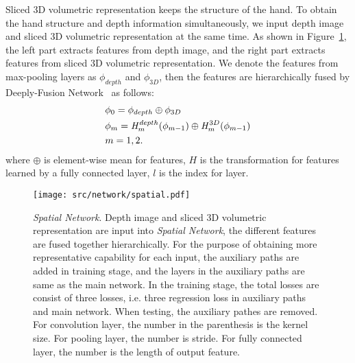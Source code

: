 \documentclass[journal,comsoc]{IEEEtran}
\let\MYoriglatexcaption\caption
\renewcommand{\caption}[2][\relax]{\MYoriglatexcaption[#2]{#2}}
\begin{document}


Sliced 3D volumetric representation keeps the structure of the hand.
To obtain the hand structure and depth information simultaneously, we input depth image and sliced 3D volumetric
representation at the same time. As shown in Figure~\ref{fig:spatial network}, the left part extracts features from
depth image, and the right part extracts features from sliced 3D volumetric representation. We denote the features
from max-pooling layers as $\phi_{depth}$ and $\phi_{3D}$, then the features are hierarchically fused by Deeply-Fusion
Network~\cite{Chen_2017_CVPR} as follows:
\begin{equation}\label{eq:deep fusion}
\begin{aligned}
&\phi_0 = \phi_{depth} \oplus \phi_{3D} \\
&\phi_m = \mathit{H}_m^{depth}(\phi_{m-1}) \oplus \mathit{H}_m^{3D}(\phi_{m-1}) \\
&m=1, 2.
\vspace{1em}
\end{aligned}
\end{equation}
where $\oplus$ is element-wise mean for features, $\mathit{H}$ is the transformation for features learned by a
fully connected layer, $l$ is the index for layer.

\begin{figure}[htbp]
    \centering
    \texttt{[image: src/network/spatial.pdf]}
    \caption{\emph{Spatial Network}. Depth image and sliced 3D volumetric representation are input
    into \emph{Spatial Network}, the different features are fused together hierarchically. For the
    purpose of obtaining more representative capability for each input, the auxiliary paths are added
    in training stage, and the layers in the auxiliary paths are same as the main network. In the training
    stage, the total losses are consist of three losses, i.e. three regression loss in auxiliary paths
    and main network. When testing, the auxiliary pathes are removed. For convolution layer, the number
    in the parenthesis is the kernel size. For pooling layer, the number is stride. For fully connected
    layer, the number is the length of output feature.}
\label{fig:spatial network}
\end{figure}
\end{document}
